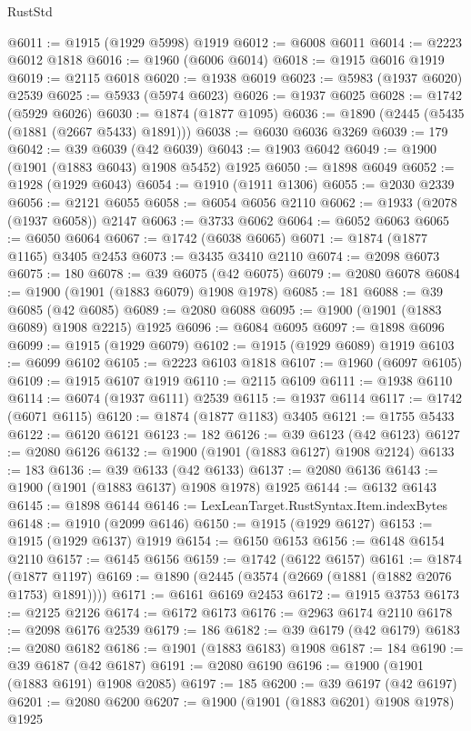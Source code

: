 \begin{lexlean}{RustStd}
\begin{coremodule}
@6011 := @1915 (@1929 @5998) @1919
@6012 := @6008 @6011
@6014 := @2223 @6012 @1818
@6016 := @1960 (@6006 @6014)
@6018 := @1915 @6016 @1919
@6019 := @2115 @6018
@6020 := @1938 @6019
@6023 := @5983 (@1937 @6020) @2539
@6025 := @5933 (@5974 @6023)
@6026 := @1937 @6025
@6028 := @1742 (@5929 @6026)
@6030 := @1874 (@1877 @1095)
@6036 := @1890 (@2445 (@5435 (@1881 (@2667 @5433) @1891)))
@6038 := @6030 @6036 @3269
@6039 := 179
@6042 := @39 @6039 (@42 @6039)
@6043 := @1903 @6042
@6049 := @1900 (@1901 (@1883 @6043) @1908 @5452) @1925
@6050 := @1898 @6049
@6052 := @1928 (@1929 @6043)
@6054 := @1910 (@1911 @1306)
@6055 := @2030 @2339
@6056 := @2121 @6055
@6058 := @6054 @6056 @2110
@6062 := @1933 (@2078 (@1937 @6058)) @2147
@6063 := @3733 @6062
@6064 := @6052 @6063
@6065 := @6050 @6064
@6067 := @1742 (@6038 @6065)
@6071 := @1874 (@1877 @1165) @3405 @2453
@6073 := @3435 @3410 @2110
@6074 := @2098 @6073
@6075 := 180
@6078 := @39 @6075 (@42 @6075)
@6079 := @2080 @6078
@6084 := @1900 (@1901 (@1883 @6079) @1908 @1978)
@6085 := 181
@6088 := @39 @6085 (@42 @6085)
@6089 := @2080 @6088
@6095 := @1900 (@1901 (@1883 @6089) @1908 @2215) @1925
@6096 := @6084 @6095
@6097 := @1898 @6096
@6099 := @1915 (@1929 @6079)
@6102 := @1915 (@1929 @6089) @1919
@6103 := @6099 @6102
@6105 := @2223 @6103 @1818
@6107 := @1960 (@6097 @6105)
@6109 := @1915 @6107 @1919
@6110 := @2115 @6109
@6111 := @1938 @6110
@6114 := @6074 (@1937 @6111) @2539
@6115 := @1937 @6114
@6117 := @1742 (@6071 @6115)
@6120 := @1874 (@1877 @1183) @3405
@6121 := @1755 @5433
@6122 := @6120 @6121
@6123 := 182
@6126 := @39 @6123 (@42 @6123)
@6127 := @2080 @6126
@6132 := @1900 (@1901 (@1883 @6127) @1908 @2124)
@6133 := 183
@6136 := @39 @6133 (@42 @6133)
@6137 := @2080 @6136
@6143 := @1900 (@1901 (@1883 @6137) @1908 @1978) @1925
@6144 := @6132 @6143
@6145 := @1898 @6144
@6146 := LexLeanTarget.RustSyntax.Item.indexBytes
@6148 := @1910 (@2099 @6146)
@6150 := @1915 (@1929 @6127)
@6153 := @1915 (@1929 @6137) @1919
@6154 := @6150 @6153
@6156 := @6148 @6154 @2110
@6157 := @6145 @6156
@6159 := @1742 (@6122 @6157)
@6161 := @1874 (@1877 @1197)
@6169 := @1890 (@2445 (@3574 (@2669 (@1881 (@1882 @2076 @1753) @1891))))
@6171 := @6161 @6169 @2453
@6172 := @1915 @3753
@6173 := @2125 @2126
@6174 := @6172 @6173
@6176 := @2963 @6174 @2110
@6178 := @2098 @6176 @2539
@6179 := 186
@6182 := @39 @6179 (@42 @6179)
@6183 := @2080 @6182
@6186 := @1901 (@1883 @6183) @1908
@6187 := 184
@6190 := @39 @6187 (@42 @6187)
@6191 := @2080 @6190
@6196 := @1900 (@1901 (@1883 @6191) @1908 @2085)
@6197 := 185
@6200 := @39 @6197 (@42 @6197)
@6201 := @2080 @6200
@6207 := @1900 (@1901 (@1883 @6201) @1908 @1978) @1925

\end{coremodule}
\end{lexlean}
